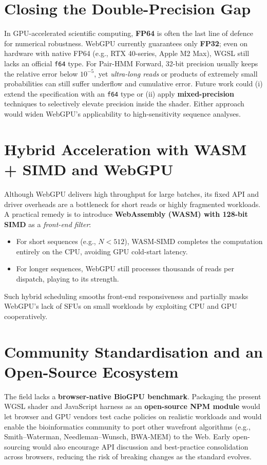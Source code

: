 \documentclass[PhD]{PHlab-thesis}
\begin{document}
\section{Closing the Double-Precision Gap}
In GPU-accelerated scientific computing, \textbf{FP64} is often the last line of defence for numerical robustness. WebGPU currently guarantees only \textbf{FP32}; even on hardware with native FP64 (e.g., RTX 40-series, Apple M2 Max), WGSL still lacks an official \texttt{f64} type. For Pair-HMM Forward, 32-bit precision usually keeps the relative error below $10^{-5}$, yet \emph{ultra-long reads} or products of extremely small probabilities can still suffer underflow and cumulative error. Future work could (i) extend the specification with an \texttt{f64} type or (ii) apply \textbf{mixed-precision} techniques to selectively elevate precision inside the shader. Either approach would widen WebGPU’s applicability to high-sensitivity sequence analyses.

\section{Hybrid Acceleration with WASM + SIMD and WebGPU}
Although WebGPU delivers high throughput for large batches, its fixed API and driver overheads are a bottleneck for short reads or highly fragmented workloads. A practical remedy is to introduce \textbf{WebAssembly (WASM) with 128-bit SIMD} as a \emph{front-end filter}:
\begin{itemize}
    \item For short sequences (e.g., $N<512$), WASM-SIMD completes the computation entirely on the CPU, avoiding GPU cold-start latency.
    \item For longer sequences, WebGPU still processes thousands of reads per dispatch, playing to its strength.
\end{itemize}
Such hybrid scheduling smooths front-end responsiveness and partially masks WebGPU’s lack of SFUs on small workloads by exploiting CPU and GPU cooperatively.

\section{Community Standardisation and an Open-Source Ecosystem}
The field lacks a \textbf{browser-native BioGPU benchmark}. Packaging the present WGSL shader and JavaScript harness as an \textbf{open-source NPM module} would let browser and GPU vendors test cache policies on realistic workloads and would enable the bioinformatics community to port other wavefront algorithms (e.g., Smith–Waterman, Needleman–Wunsch, BWA-MEM) to the Web. Early open-sourcing would also encourage API discussion and best-practice consolidation across browsers, reducing the risk of breaking changes as the standard evolves.
\end{document}
